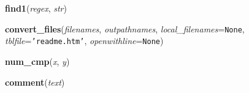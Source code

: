     \vspace{0.5ex}

\hspace{.8\funcindent}\begin{boxedminipage}{\funcwidth}

    \raggedright \textbf{find1}(\textit{regex}, \textit{str})

\setlength{\parskip}{2ex}
\setlength{\parskip}{1ex}
    \end{boxedminipage}

    \label{System:Web:py2html:convert_files}

    \vspace{0.5ex}

\hspace{.8\funcindent}\begin{boxedminipage}{\funcwidth}

    \raggedright \textbf{convert\_files}(\textit{filenames}, \textit{outpathnames}, \textit{local\_filenames}={\tt None}, \textit{tblfile}={\tt 'readme.htm'}, \textit{openwithline}={\tt None})

\setlength{\parskip}{2ex}
\setlength{\parskip}{1ex}
    \end{boxedminipage}

    \label{System:Web:py2html:num_cmp}

    \vspace{0.5ex}

\hspace{.8\funcindent}\begin{boxedminipage}{\funcwidth}

    \raggedright \textbf{num\_cmp}(\textit{x}, \textit{y})

\setlength{\parskip}{2ex}
\setlength{\parskip}{1ex}
    \end{boxedminipage}

    \label{System:Web:py2html:comment}

    \vspace{0.5ex}

\hspace{.8\funcindent}\begin{boxedminipage}{\funcwidth}

    \raggedright \textbf{comment}(\textit{text})

\setlength{\parskip}{2ex}
\setlength{\parskip}{1ex}
    \end{boxedminipage}


